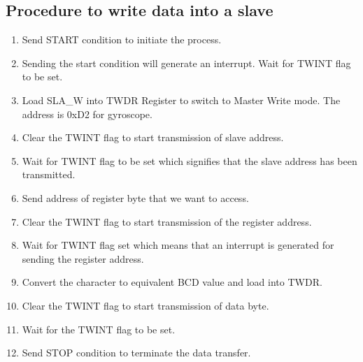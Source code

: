 \documentclass[a4paper,12 pt]{article}
\begin{document}
\subsection{Procedure to write data into a slave}
\begin{enumerate}

\item Send START condition to initiate the process.
\item Sending the start condition will generate an interrupt. Wait for TWINT flag to be set. 
\item Load SLA\_W into TWDR Register to switch to Master Write mode. The address is 0xD2 for gyroscope. 
\item Clear the TWINT flag to start transmission of slave address.
\item Wait for TWINT flag to be set which signifies that the slave address has been transmitted.
\item Send address of register byte that we want to access.
\item Clear the TWINT flag to start transmission of the register address.
\item Wait for TWINT flag set which means that an interrupt is generated for sending the register address.
\item Convert the character to equivalent BCD value and load into TWDR.
\item Clear the TWINT flag to start transmission of data byte.
\item Wait for the TWINT flag to be set.
\item Send STOP condition to terminate the data transfer.

\end{enumerate}
\end{document}
